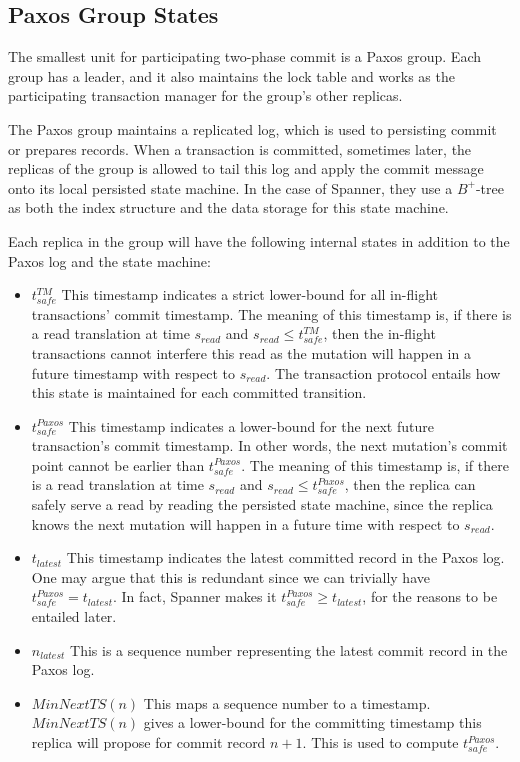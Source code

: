 \subsection{Paxos Group States}
The smallest unit for participating two-phase commit is a Paxos group. Each
group has a leader, and it also maintains the lock table and works as the
participating transaction manager for the group's other replicas.

The Paxos group maintains a replicated log, which is used to persisting commit
or prepares records. When a transaction is committed, sometimes later, the replicas
of the group is allowed to tail this log and apply the commit message onto its
local persisted state machine. In the case of Spanner, they use a $B^+$-tree
as both the index structure and the data storage for this state machine.

Each replica in the group will have the following internal states in addition
to the Paxos log and the state machine:
\begin{itemize}
   \item $t_{safe}^{TM}$
      This timestamp indicates a strict lower-bound for all in-flight
      transactions' commit timestamp. The meaning of this timestamp is, if
      there is a read translation at time $s_{read}$ and $s_{read} \le
      t_{safe}^{TM}$, then the in-flight transactions cannot interfere this
      read as the mutation will happen in a future timestamp with respect to
      $s_{read}$. The transaction protocol entails how this state is maintained
      for each committed transition.
   \item $t_{safe}^{Paxos}$
      This timestamp indicates a lower-bound for the next future transaction's
      commit timestamp. In other words, the next mutation's commit point cannot
      be earlier than $t_{safe}^{Paxos}$. The meaning of this timestamp is,
      if there is a read translation at time $s_{read}$ and $s_{read} \le
      t_{safe}^{Paxos}$, then the replica can safely serve a read by reading
      the persisted state machine, since the replica knows the next mutation
      will happen in a future time with respect to $s_{read}$.
   \item $t_{latest}$
      This timestamp indicates the latest committed record in the Paxos log.
      One may argue that this is redundant since we can trivially have
      $t_{safe}^{Paxos} = t_{latest}$. In fact, Spanner makes it
      $t_{safe}^{Paxos} \ge t_{latest}$, for the reasons to be entailed later.
   \item $n_{latest}$
      This is a sequence number representing the latest commit record in the
      Paxos log.
   \item $MinNextTS(n)$
      This maps a sequence number to a timestamp. $MinNextTS(n)$ gives a
      lower-bound for the committing timestamp this replica will propose for
      commit record $n+1$. This is used to compute $t_{safe}^{Paxos}$.
\end{itemize}

